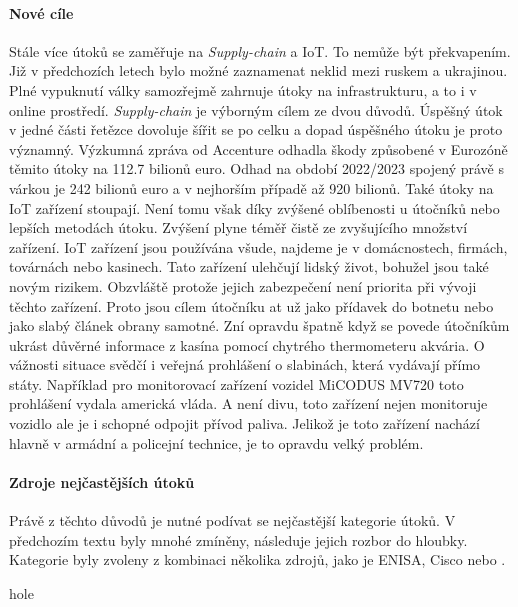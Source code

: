 \paragraph{Nové cíle}
Stále více útoků se zaměřuje na \textit{Supply-chain} a \ac{IoT}.
To nemůže být překvapením.
Již v předchozích letech bylo možné zaznamenat neklid mezi ruskem a ukrajinou.
Plné vypuknutí války samozřejmě zahrnuje útoky na infrastrukturu, a to i v online prostředí.
\textit{Supply-chain} je výborným cílem ze dvou důvodů.
Úspěšný útok v jedné části řetězce dovoluje šířit se po celku a dopad úspěšného útoku je proto významný.
Výzkumná zpráva od Accenture\cite{accenture_supply-chain-disruption} odhadla škody způsobené v Eurozóně těmito útoky na 112.7 bilionů euro.
Odhad na období 2022/2023 spojený právě s várkou je 242 bilionů euro a v nejhorším případě až 920 bilionů.
Také útoky na \ac{IoT} zařízení stoupají.
Není tomu však díky zvýšené oblíbenosti u útočníků nebo lepších metodách útoku.
Zvýšení plyne téměř čistě ze zvyšujícího množství zařízení.
\ac{IoT} zařízení jsou používána všude, najdeme je v domácnostech, firmách, továrnách nebo kasinech.
Tato zařízení ulehčují lidský život, bohužel jsou také novým rizikem.
Obzvláště protože jejich zabezpečení není priorita při vývoji těchto zařízení.
Proto jsou cílem útočníku at už jako přídavek do botnetu nebo jako slabý článek obrany samotné.
Zní opravdu špatně když se povede útočníkům ukrást důvěrné informace z kasína pomocí chytrého thermometeru akvária\cite{casino_thermometer}.
O vážnosti situace svědčí i veřejná prohlášení o slabinách, která vydávají přímo státy.
Například pro monitorovací zařízení vozidel MiCODUS MV720 toto prohlášení vydala americká vláda\cite{america_gov_advisories_micodus}.
A není divu, toto zařízení nejen monitoruje vozidlo ale je i schopné odpojit přívod paliva.
Jelikož je toto zařízení nachází hlavně v armádní a policejní technice, je to opravdu velký problém.\cite{securityintelligence_most_common_2022_attacks}

\paragraph{Zdroje nejčastějších útoků}
Právě z těchto důvodů je nutné podívat se nejčastější kategorie útoků.
V předchozím textu byly mnohé zmíněny, následuje jejich rozbor do hloubky.
Kategorie byly zvoleny z kombinaci několika zdrojů, jako je \ac{ENISA}\cite{Enisa_thread_landscape}, Cisco\cite{cisco_most_common_attack} nebo \cite{nist_risks}.


hole\cite{Enisa_thread_landscape}

